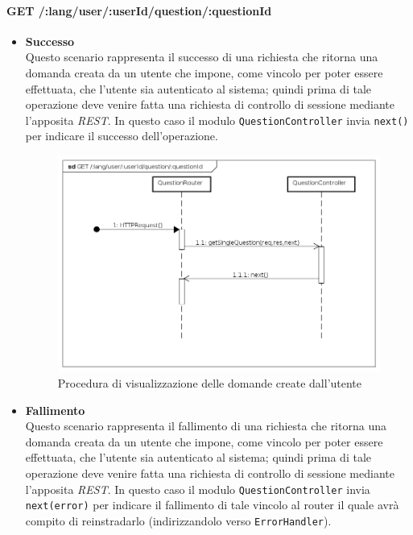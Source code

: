 \paragraph{GET /:lang/user/:userId/question/:questionId}
\begin{itemize}
\item \textbf{Successo}\\
Questo scenario rappresenta il successo di una richiesta che ritorna una domanda creata da un utente che impone, come vincolo per poter essere effettuata, che l'utente sia autenticato al sistema; quindi prima di tale operazione deve venire fatta una richiesta di controllo di sessione mediante l'apposita \textit{REST}. In questo caso il modulo \texttt{QuestionController} invia \texttt{next()} per indicare il successo dell'operazione.


\begin{figure}[ht]
	\centering
	\includegraphics[scale=0.45]{UML/DiagrammiDiSequenza/Back-end/GET__lang_user__userId_question__questionId_success.png}
	\caption{Procedura di visualizzazione delle domande create dall'utente}
\end{figure}
\FloatBarrier

\item \textbf{Fallimento}\\
Questo scenario rappresenta il fallimento di una richiesta che ritorna una domanda creata da un utente che impone, come vincolo per poter essere effettuata, che l'utente sia autenticato al sistema; quindi prima di tale operazione deve venire fatta una richiesta di controllo di sessione mediante l'apposita \textit{REST}. In questo caso il modulo \texttt{QuestionController} invia \texttt{next(error)} per indicare il fallimento di tale vincolo al router il quale avrà compito di reinstradarlo (indirizzandolo verso \texttt{ErrorHandler}).


\end{itemize}
